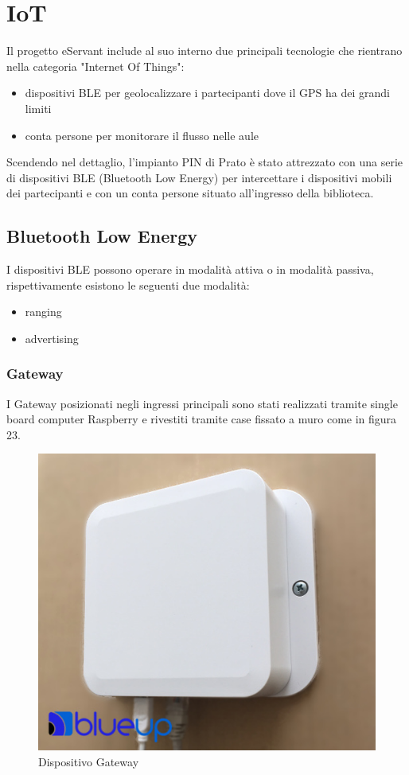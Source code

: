 \chapter{IoT}
Il progetto eServant include al suo interno due principali tecnologie che rientrano nella categoria
"Internet Of Things":
\begin{itemize}
    \item dispositivi BLE per geolocalizzare i partecipanti dove il GPS ha dei grandi limiti
    \item conta persone per monitorare il flusso nelle aule
\end{itemize}


Scendendo nel dettaglio, l'impianto PIN di Prato è stato attrezzato con una serie di dispositivi BLE 
(Bluetooth Low Energy) per intercettare i dispositivi mobili dei partecipanti e con un conta persone
situato all'ingresso della biblioteca.

\section{Bluetooth Low Energy}
I dispositivi BLE possono operare in modalità attiva o in modalità passiva, rispettivamente esistono
le seguenti due modalità:
\begin{itemize}
    \item ranging
    \item advertising
\end{itemize}


\subsection{Gateway}
I Gateway posizionati negli ingressi principali sono stati realizzati tramite single board computer 
Raspberry e rivestiti tramite case fissato a muro come in figura 23.
\begin{figure}[H]
    \caption{Dispositivo Gateway}
    \centering  
    \includegraphics[scale=0.4]{img/cap4/gateway}
\end{figure}

